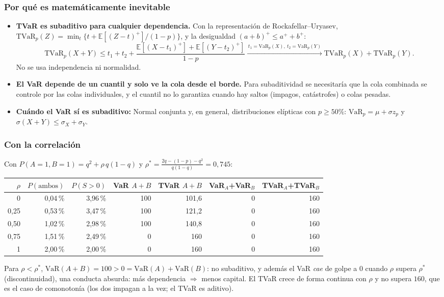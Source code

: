 \documentclass[a4paper,12pt]{article}
\newcommand{\E}{\mathbb{E}}
\newcommand{\VaR}{\mathrm{VaR}}
\newcommand{\TVaR}{\mathrm{TVaR}}
\begin{document}
\subsubsection*{Por qu\'e es matem\'aticamente inevitable}
\begin{itemize}[leftmargin=*]
\item \textbf{TVaR es subaditivo para cualquier dependencia.} Con la representaci\'on de Rockafellar--Uryasev, $\TVaR_p(Z)=\min_t\{t+\E[(Z-t)^+]/(1-p)\}$, y la desigualdad $(a+b)^+\le a^++b^+$:
\[
\TVaR_p(X+Y)\le t_1+t_2+\frac{\E[(X-t_1)^+]+\E[(Y-t_2)^+]}{1-p}\xrightarrow{\,t_1=\VaR_p(X),\ t_2=\VaR_p(Y)\,}\TVaR_p(X)+\TVaR_p(Y).
\]
No se usa independencia ni normalidad.
\item \textbf{El VaR depende de un cuantil y solo ve la cola desde el borde.} Para subaditividad se necesitar\'ia que la cola combinada se controle por las colas individuales, y el cuantil no lo garantiza cuando hay saltos (impagos, cat\'astrofes) o colas pesadas.
\item \textbf{Cu\'ando el VaR s\'i es subaditivo:} Normal conjunta y, en general, distribuciones el\'ipticas con $p\ge50\%$: $\VaR_p=\mu+\sigma z_p$ y $\sigma(X+Y)\le\sigma_X+\sigma_Y$.
\end{itemize}

\subsubsection*{Con la correlaci\'on}
Con $P(A=1,B=1)=q^2+\rho\,q(1-q)$ y $\rho^*=\frac{2q-(1-p)-q^2}{q(1-q)}=0{,}745$:
\begin{center}
\small
\begin{tabular}{rrrrrrr}
\toprule
$\rho$ & $P(\text{ambos})$ & $P(S>0)$ & VaR $A{+}B$ & TVaR $A{+}B$ & VaR$_A$+VaR$_B$ & TVaR$_A$+TVaR$_B$\\
\midrule
0 & 0,04\,\% & 3,96\,\% & 100 & 101,6 & 0 & 160\\
0,25 & 0,53\,\% & 3,47\,\% & 100 & 121,2 & 0 & 160\\
0,50 & 1,02\,\% & 2,98\,\% & 100 & 140,8 & 0 & 160\\
0,75 & 1,51\,\% & 2,49\,\% & 0 & 160 & 0 & 160\\
1 & 2,00\,\% & 2,00\,\% & 0 & 160 & 0 & 160\\
\bottomrule
\end{tabular}
\end{center}
Para $\rho<\rho^*$, $\VaR(A+B)=100>0=\VaR(A)+\VaR(B)$: no subaditivo, y adem\'as el VaR \emph{cae} de golpe a $0$ cuando $\rho$ supera $\rho^*$ (discontinuidad), una conducta absurda: m\'as dependencia $\Rightarrow$ menos capital. El TVaR crece de forma continua con $\rho$ y no supera $160$, que es el caso de comonoton\'ia (los dos impagan a la vez; el TVaR es aditivo).
\end{document}
